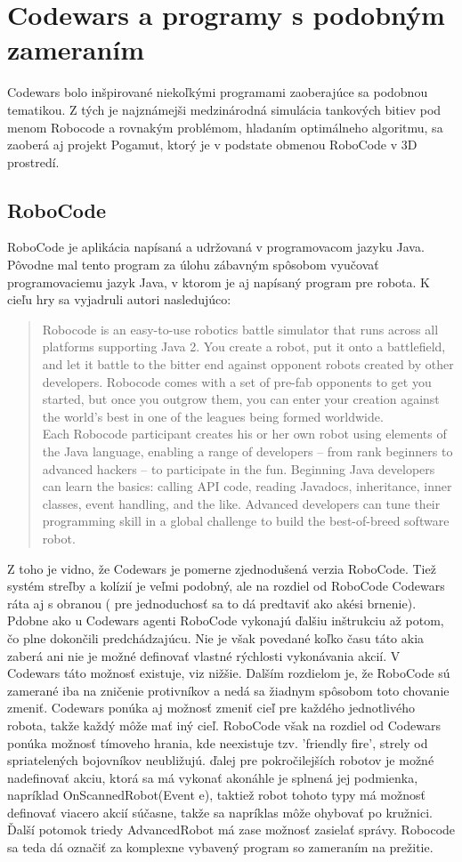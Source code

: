 \section{Codewars  a programy s podobným zameraním}
Codewars bolo inšpirované niekoľkými programami zaoberajúce sa podobnou tematikou. Z tých je najznámejši medzinárodná simulácia tankových bitiev pod menom Robocode\cite{robocode} a rovnakým problémom, hladaním optimálneho algoritmu, sa zaoberá aj projekt Pogamut\cite{pogamut}, ktorý je v podstate obmenou RoboCode v 3D prostredí.\\
\subsection {RoboCode}
RoboCode je aplikácia napísaná a udržovaná v programovacom jazyku Java. Pôvodne mal tento program za úlohu zábavným spôsobom vyučovať programovaciemu jazyk Java, v ktorom je aj napísaný program pre robota. K cieľu hry sa vyjadruli autori nasledujúco:
\begin{quote}Robocode is an easy-to-use robotics battle simulator that runs across all platforms supporting Java 2. You create a robot, put it onto a battlefield, and let it battle to the bitter end against opponent robots created by other developers. Robocode comes with a set of pre-fab opponents to get you started, but once you outgrow them, you can enter your creation against the world's best in one of the leagues being formed worldwide.\\
	Each Robocode participant creates his or her own robot using elements of the Java language, enabling a range of developers -- from rank beginners to advanced hackers -- to participate in the fun. Beginning Java developers can learn the basics: calling API code, reading Javadocs, inheritance, inner classes, event handling, and the like. Advanced developers can tune their programming skill in a global challenge to build the best-of-breed software robot.\end{quote}
Z toho je vidno, že Codewars je pomerne zjednodušená verzia RoboCode. Tiež systém streľby a kolízií je veľmi podobný, ale na rozdiel od RoboCode Codewars ráta aj s obranou ( pre jednoduchosť sa to dá predtaviť ako akési brnenie). Pdobne ako u Codewars agenti RoboCode vykonajú ďalšiu inštrukciu až potom, čo plne dokončili predchádzajúcu. Nie je však povedané koľko času táto akia zaberá ani nie je možné definovať vlastné rýchlosti vykonávania akcií. V Codewars táto možnosť existuje, viz nižšie. %
Dalším rozdielom je, že RoboCode sú zamerané iba na zničenie protivníkov a nedá sa žiadnym spôsobom toto chovanie zmeniť. Codewars ponúka aj možnosť zmeniť cieľ pre každého jednotlivého robota, takže každý môže mať iný cieľ. RoboCode však na rozdiel od Codewars ponúka možnosť tímoveho hrania, kde neexistuje tzv. 'friendly fire', strely od spriatelených bojovníkov neubližujú. ďalej pre pokročilejších robotov je možné nadefinovať akciu, ktorá sa má vykonať akonáhle je splnená jej podmienka, napríklad OnScannedRobot(Event e), taktiež robot tohoto typy má možnosť definovať viacero akcií súčasne, takže sa napríklas môže ohybovať po kružnici. Ďalší potomok triedy AdvancedRobot má zase možnosť zasielať správy. Robocode sa teda dá označiť za komplexne vybavený program so zameraním na prežitie.

